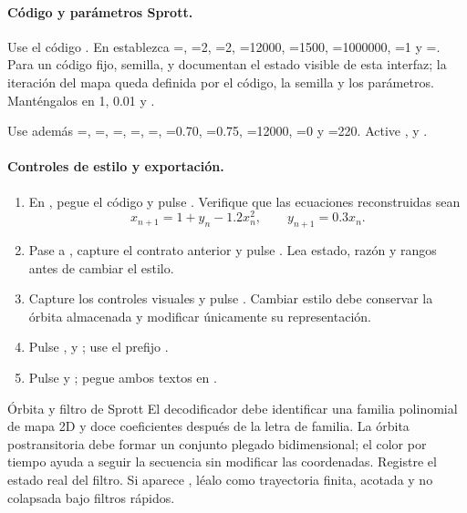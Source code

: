 \paragraph{Código y parámetros Sprott.}
Use el código . En  establezca
=, =2, =2,
=12000, =1500,
=1000000, =1 y
=. Para un código fijo, semilla,
 y  documentan el estado visible de esta interfaz; la iteración del mapa queda definida por el código, la semilla y los parámetros. Manténgalos
en 1, 0.01 y .

Use además =,
=, =,
=, =,
=0.70, =0.75,
=12000, =0 y
=220. Active ,
 y .

\paragraph{Controles de estilo y exportación.}
\begin{enumerate}
  \item En , pegue el código y pulse .
  Verifique que las ecuaciones reconstruidas sean
  \[
    x_{n+1}=1+y_n-1.2x_n^2,
    \qquad y_{n+1}=0.3x_n.
  \]
  \item Pase a , capture el contrato anterior y pulse
  . Lea estado, razón y rangos antes de cambiar el
  estilo.
  \item Capture los controles visuales y pulse . Cambiar
  estilo debe conservar la órbita almacenada y modificar únicamente su representación.
  \item Pulse ,
   y ; use el prefijo
  .
  \item Pulse  y ; pegue ambos textos
  en .
\end{enumerate}

\begin{cajaverde}{Órbita y filtro de Sprott}
El decodificador debe identificar una familia polinomial de mapa 2D y doce
coeficientes después de la letra de familia. La órbita postransitoria debe
formar un conjunto plegado bidimensional; el color por tiempo ayuda a seguir la
secuencia sin modificar las coordenadas. Registre el estado real del filtro. Si
aparece , léalo como trayectoria finita, acotada y
no colapsada bajo filtros rápidos.
\end{cajaverde}

